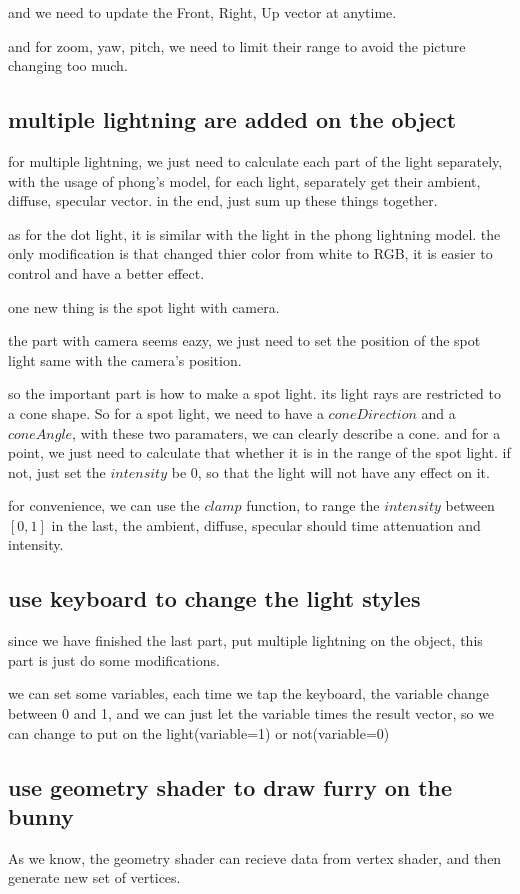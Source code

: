 \documentclass[acmtog]{acmart}
\begin{document}
and we need to update the Front, Right, Up vector at anytime.

and for zoom, yaw, pitch, we need to limit their range to avoid the picture changing too much.


\subsection{multiple lightning are added on the object}
for multiple lightning, we just need to calculate each part of the light separately,
with the usage of phong's model, for each light, separately get their ambient, diffuse, specular vector.
in the end, just sum up these things together.

as for the dot light, it is similar with the light in the phong lightning model.
the only modification is that changed thier color from white to RGB, it is easier to control and have a better effect.

one new thing is the spot light with camera.

the part with camera seems eazy, we just need to set the position of the spot light same with the camera's position.

so the important part is how to make a spot light.
its light rays are restricted to a cone shape.
So for a spot light, we need to have a \(coneDirection\) and a \(coneAngle\), with these two paramaters, we can clearly describe a cone.
and for a point, we just need to calculate that whether it is in the range of the spot light.
if not, just set the \(intensity \) be 0, so that the light will not have any effect on it.

for convenience, we can use the \(clamp\) function, to range the \(intensity \) between \([0,1]\)
in the last, the ambient, diffuse, specular should time attenuation and intensity.

\subsection{use keyboard to change the light styles}
since we have finished the last part, put multiple lightning on the object,
this part is just do some modifications.

we can set some variables, each time we tap the keyboard, the variable change 
between 0 and 1, and we can just let the variable times the result vector,
 so we can change to put on the light(variable=1) or not(variable=0)

\subsection{use geometry shader to draw furry on the bunny}
As we know, the geometry shader can recieve data from vertex shader, and then
generate new set of vertices.
\end{document}
